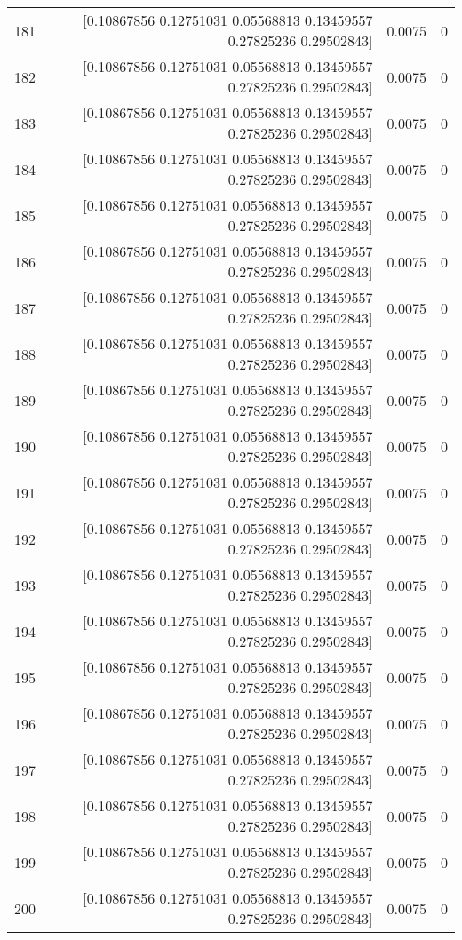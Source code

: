 \begin{longtable}{lrrr}
181 & [0.10867856 0.12751031 0.05568813 0.13459557 0.27825236 0.29502843] & 0.0075 & 0 \\
182 & [0.10867856 0.12751031 0.05568813 0.13459557 0.27825236 0.29502843] & 0.0075 & 0 \\
183 & [0.10867856 0.12751031 0.05568813 0.13459557 0.27825236 0.29502843] & 0.0075 & 0 \\
184 & [0.10867856 0.12751031 0.05568813 0.13459557 0.27825236 0.29502843] & 0.0075 & 0 \\
185 & [0.10867856 0.12751031 0.05568813 0.13459557 0.27825236 0.29502843] & 0.0075 & 0 \\
186 & [0.10867856 0.12751031 0.05568813 0.13459557 0.27825236 0.29502843] & 0.0075 & 0 \\
187 & [0.10867856 0.12751031 0.05568813 0.13459557 0.27825236 0.29502843] & 0.0075 & 0 \\
188 & [0.10867856 0.12751031 0.05568813 0.13459557 0.27825236 0.29502843] & 0.0075 & 0 \\
189 & [0.10867856 0.12751031 0.05568813 0.13459557 0.27825236 0.29502843] & 0.0075 & 0 \\
190 & [0.10867856 0.12751031 0.05568813 0.13459557 0.27825236 0.29502843] & 0.0075 & 0 \\
191 & [0.10867856 0.12751031 0.05568813 0.13459557 0.27825236 0.29502843] & 0.0075 & 0 \\
192 & [0.10867856 0.12751031 0.05568813 0.13459557 0.27825236 0.29502843] & 0.0075 & 0 \\
193 & [0.10867856 0.12751031 0.05568813 0.13459557 0.27825236 0.29502843] & 0.0075 & 0 \\
194 & [0.10867856 0.12751031 0.05568813 0.13459557 0.27825236 0.29502843] & 0.0075 & 0 \\
195 & [0.10867856 0.12751031 0.05568813 0.13459557 0.27825236 0.29502843] & 0.0075 & 0 \\
196 & [0.10867856 0.12751031 0.05568813 0.13459557 0.27825236 0.29502843] & 0.0075 & 0 \\
197 & [0.10867856 0.12751031 0.05568813 0.13459557 0.27825236 0.29502843] & 0.0075 & 0 \\
198 & [0.10867856 0.12751031 0.05568813 0.13459557 0.27825236 0.29502843] & 0.0075 & 0 \\
199 & [0.10867856 0.12751031 0.05568813 0.13459557 0.27825236 0.29502843] & 0.0075 & 0 \\
200 & [0.10867856 0.12751031 0.05568813 0.13459557 0.27825236 0.29502843] & 0.0075 & 0 \\

\end{longtable}
